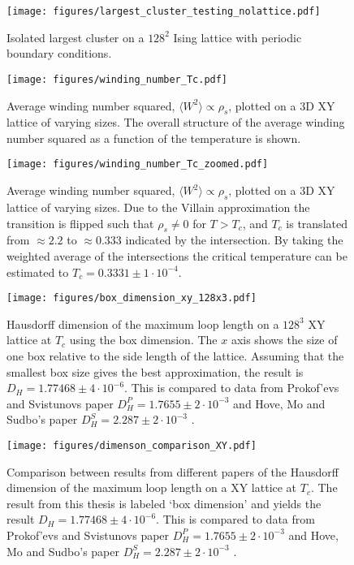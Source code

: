 \begin{figure}[h!]
    \centering
        \texttt{[image: figures/largest\_cluster\_testing\_nolattice.pdf]}
    \caption{Isolated largest cluster on a $128^2$ Ising lattice with periodic boundary conditions.}
    \label{fig:largest_cluster_illu}
\end{figure}

\begin{figure}[h!]
    \centering
        \texttt{[image: figures/winding\_number\_Tc.pdf]}
    \caption{Average winding number squared, $\langle W^2 \rangle \propto \rho_s$, plotted on a 3D XY lattice of varying sizes. The overall structure of the average winding number squared as a function of the temperature is shown.}
    \label{fig:results_windingnumberTc}
\end{figure}


\begin{figure}[h!]
    \centering
        \texttt{[image: figures/winding\_number\_Tc\_zoomed.pdf]}
    \caption{Average winding number squared, $\langle W^2 \rangle \propto \rho_s$, plotted on a 3D XY lattice of varying sizes. Due to the Villain approximation the transition is flipped such that $\rho_s \neq 0$ for $T > T_c$, and $T_c$ is translated from $\approx 2.2$ \cite{Gottlob:CritBehaviour3DXY} to $\approx 0.333$ indicated by the intersection. By taking the weighted average of the intersections the critical temperature can be estimated to $T_c = 0.3331 \pm 1 \cdot 10^{-4}$.}
    \label{fig:results_windingnumberTcZoomed}
\end{figure}

\begin{figure}[h!]
    \centering
        \texttt{[image: figures/box\_dimension\_xy\_128x3.pdf]}
    \caption{Hausdorff dimension of the maximum loop length on a $128^3$ XY lattice at $T_c$ using the box dimension. The $x$ axis shows the size of one box relative to the side length of the lattice. Assuming that the smallest box size gives the best approximation, the result is $D_H = 1.77468 \pm 4 \cdot 10^{-6}$. This is compared to data from Prokof'evs and Svistunovs paper $D_H^P = 1.7655 \pm 2 \cdot 10^{-3}$ \cite{Prokofev:comment_on_hove_hausdorff_crit_fluct} and Hove, Mo and Sudbo's paper $D_H^S = 2.287 \pm 2 \cdot 10^{-3}$ \cite{Hove:hausdorff_crit_fluctuations}.}
    \label{fig:results_boxdimension}
\end{figure}


\begin{figure}[h!]
    \centering
        \texttt{[image: figures/dimenson\_comparison\_XY.pdf]}
    \caption{Comparison between results from different papers of the Hausdorff dimension of the maximum loop length on a XY lattice at $T_c$. The result from this thesis is labeled `box dimension' and yields the result $D_H = 1.77468 \pm 4 \cdot 10^{-6}$. This is compared to data from Prokof'evs and Svistunovs paper $D_H^P = 1.7655 \pm 2 \cdot 10^{-3}$ \cite{Prokofev:comment_on_hove_hausdorff_crit_fluct} and Hove, Mo and Sudbo's paper $D_H^S = 2.287 \pm 2 \cdot 10^{-3}$ \cite{Hove:hausdorff_crit_fluctuations}.}
    \label{fig:dim_comparison_xy}
\end{figure}

